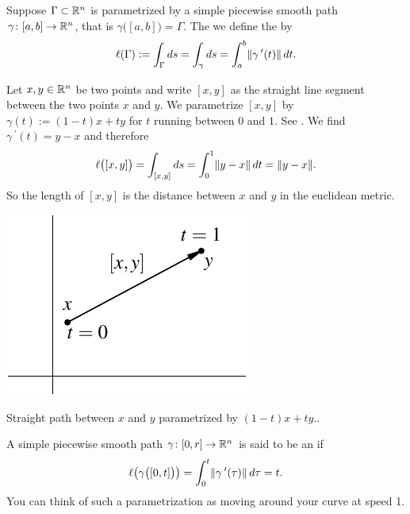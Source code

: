 \begin{defn}
Suppose $\Gamma \subset {\mathbb{R}}^n$ is parametrized by a simple
piecewise smooth path $\gamma \colon [a,b] \to {\mathbb{R}}^n$, that is
$\gamma\bigl( [a,b] \bigr) = \Gamma$.  The we define the
\emph{} by
\begin{equation*}
\ell(\Gamma) := \int_{\Gamma} ds = \int_{\gamma} ds = \int_a^b
\lVert {\gamma^{\:\prime}(t)} \rVert\, dt .
\end{equation*}
\end{defn}

\begin{example}
Let $x,y \in {\mathbb{R}}^n$ be two points and write $[x,y]$ as the straight line
segment between the two points $x$ and $y$.  We parametrize
$[x,y]$ by $\gamma(t) := (1-t)x + ty$ for $t$ running between $0$ and $1$.
See .
We find $\gamma^{\:\prime}(t) = y-x$ and therefore
\begin{equation*}
\ell\bigl([x,y]\bigr)
=
\int_{[x,y]} ds
=
\int_0^1 \lVert {y-x} \rVert \, dt
=
\lVert {y-x} \rVert .
\end{equation*}
So the length of $[x,y]$ is the distance between $x$ and $y$ in the
euclidean metric.
\begin{myfigureht}
\includegraphics{figures/straightpath}
\caption{Straight path between $x$ and $y$ parametrized
by $(1-t)x + ty$..\label{fig:straightpath}}
\end{myfigureht}
\end{example}

A simple piecewise smooth path $\gamma \colon [0,r] \to {\mathbb{R}}^n$ is
said to be an \emph{} if
\begin{equation*}
\ell\bigl( \gamma\bigl([0,t]\bigr) \bigr) = \int_0^t
\lVert {\gamma^{\:\prime}(\tau)} \rVert
\, d\tau  = t .
\end{equation*}
You can think of such a parametrization as moving around your curve at speed
1.

